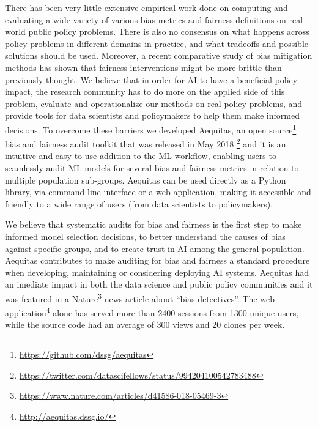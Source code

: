 There has been very little extensive empirical work done on computing and evaluating a wide variety of various bias metrics and fairness definitions on real world public policy problems. There is also no consensus on what happens across policy problems in different domains in practice, and what tradeoffs and possible solutions should be used. Moreover, a recent comparative study \cite{friedler2018comparative} of bias mitigation methods has shown that 
fairness interventions might be more brittle than previously thought. We believe that in order for AI to have a beneficial policy impact, the research community has to do more on the applied side of this problem, evaluate and operationalize our methods on real policy problems, and provide tools for data scientists and policymakers to help them make informed decisions. To overcome these barriers we developed Aequitas, an open source\footnote{\url{https://github.com/dssg/aequitas}} bias and fairness audit toolkit that was released in May 2018 \footnote{\url{https://twitter.com/datascifellows/status/994204100542783488}} and it is an intuitive and easy to use addition to the ML workflow, enabling users to seamlessly audit ML models for several bias and fairness metrics in relation to multiple population sub-groups. Aequitas can be used directly as a Python library, via command line interface or a web application, making it accessible and friendly to a wide range of users (from data scientists to policymakers). 

We believe that systematic audits for bias and fairness is the first step to make informed model selection decisions, to better understand the causes of bias against specific groups, and to create trust in AI among the general population.  Aequitas contributes to make auditing for bias and fairness a standard procedure when developing, maintaining or considering deploying AI systems. Aequitas had an imediate impact in both the data science and public policy communities and it was featured in a Nature\footnote{\url{https://www.nature.com/articles/d41586-018-05469-3}} news article about ``bias detectives''. The web application\footnote{\url{http://aequitas.dssg.io/}} alone has served more than 2400 sessions from 1300 unique users, while the source code had an average of 300 views and 20 clones per week.







